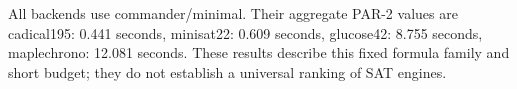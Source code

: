 All backends use commander/minimal. Their aggregate PAR-2 values are cadical195: 0.441 seconds, minisat22: 0.609 seconds, glucose42: 8.755 seconds, maplechrono: 12.081 seconds. These results describe this fixed formula family and short budget; they do not establish a universal ranking of SAT engines.
